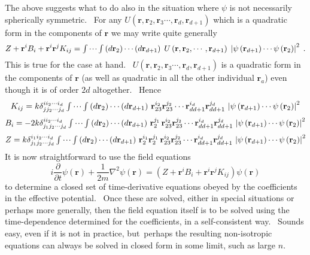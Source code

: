 \documentclass[a4paper,12pt]{article}%
\begin{document}
The above suggests what to do also in the situation where $\psi$ is not
necessarily spherically symmetric. \ For any $U\left(  \mathbf{r}%
,\mathbf{r}_{2},\mathbf{r}_{3}\cdots,\mathbf{r}_{d},\mathbf{r}_{d+1}\right)  $
which is a quadratic form in the components of $\mathbf{r}$ we may write quite
generally
\[
Z+\mathbf{r}^{i}B_{i}+\mathbf{r}^{i}\mathbf{r}^{j}K_{ij}=%
{\textstyle\idotsint}
\left(  d\mathbf{r}_{2}\right)  \cdots\left(  d\mathbf{r}_{d+1}\right)
\;U\left(  \mathbf{r},\mathbf{r}_{2},\cdots,\mathbf{r}_{d+1}\right)  \;\left|
\psi\left(  \mathbf{r}_{d+1}\right)  \cdots\psi\left(  \mathbf{r}_{2}\right)
\right|  ^{2}\;.
\]
This is true for the case at hand. \ $U\left(  \mathbf{r},\mathbf{r}%
_{2},\mathbf{r}_{3}\cdots,\mathbf{r}_{d},\mathbf{r}_{d+1}\right)  $ is a
quadratic form in the components of $\mathbf{r}$ (as well as quadratic in all
the other individual $\mathbf{r}_{a}$) even though it is of order $2d$
altogether. \ Hence
\[
K_{ij}=k\delta_{jj_{2}\cdots j_{d}}^{ii_{2}\cdots i_{d}}\,%
{\textstyle\idotsint}
\left(  d\mathbf{r}_{2}\right)  \cdots\left(  d\mathbf{r}_{d+1}\right)
\,\mathbf{r}_{23}^{i_{2}}\mathbf{r}_{23}^{j_{2}}\cdots\mathbf{r}_{dd+1}%
^{i_{d}}\mathbf{r}_{dd+1}^{j_{d}}\,\left|  \psi\left(  \mathbf{r}%
_{d+1}\right)  \cdots\psi\left(  \mathbf{r}_{2}\right)  \right|  ^{2}%
\]%
\[
B_{i}=-2k\delta_{j_{1}j_{2}\cdots j_{d}}^{ii_{2}\cdots i_{d}}\,%
{\textstyle\idotsint}
\left(  d\mathbf{r}_{2}\right)  \cdots\left(  d\mathbf{r}_{d+1}\right)
\,\mathbf{r}_{2}^{j_{1}}\,\mathbf{r}_{23}^{i_{2}}\mathbf{r}_{23}^{j_{2}}%
\cdots\mathbf{r}_{dd+1}^{i_{d}}\mathbf{r}_{dd+1}^{j_{d}}\,\left|  \psi\left(
\mathbf{r}_{d+1}\right)  \cdots\psi\left(  \mathbf{r}_{2}\right)  \right|
^{2}%
\]%
\[
Z=k\delta_{j_{1}j_{2}\cdots j_{d}}^{i_{1}i_{2}\cdots i_{d}}\,%
{\textstyle\idotsint}
\left(  d\mathbf{r}_{2}\right)  \cdots\left(  d\mathbf{r}_{d+1}\right)
\,\mathbf{r}_{2}^{i_{1}}\mathbf{r}_{2}^{j_{1}}\,\mathbf{r}_{23}^{i_{2}%
}\mathbf{r}_{23}^{j_{2}}\cdots\mathbf{r}_{dd+1}^{i_{d}}\mathbf{r}%
_{dd+1}^{j_{d}}\,\left|  \psi\left(  \mathbf{r}_{d+1}\right)  \cdots
\psi\left(  \mathbf{r}_{2}\right)  \right|  ^{2}%
\]
It is now straightforward to use the field equations
\[
i\frac{\partial}{\partial t}\psi\left(  \mathbf{r}\right)  +\frac{1}{2m}%
\nabla^{2}\psi\left(  \mathbf{r}\right)  =\left(  Z+\mathbf{r}^{i}%
B_{i}+\mathbf{r}^{i}\mathbf{r}^{j}K_{ij}\right)  \psi\left(  \mathbf{r}%
\right)
\]
to determine a closed set of time-derivative equations obeyed by the
coefficients in the effective potential. \ Once these are solved, either in
special situations or perhaps more generally, then the field equation itself
is to be solved using the time-dependence determined for the coefficients, in
a self-consistent way. \ Sounds easy, even if it is not in practice,
but\ perhaps the resulting non-isotropic equations can always be solved in
closed form in some limit, such as large $n$.
\end{document}
